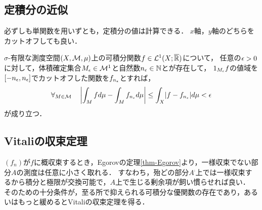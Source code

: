 \documentclass[uplatex, dvipdfmx]{jsreport}
\begin{document}
\subsection{定積分の近似}

\begin{tcolorbox}[colframe=ForestGreen, colback=ForestGreen!10!white,breakable,colbacktitle=ForestGreen!40!white,coltitle=black,fonttitle=\bfseries\sffamily,
title=]
    必ずしも単関数を用いずとも，定積分の値は計算できる．
    $x$軸，$y$軸のどちらをカットオフしても良い．
\end{tcolorbox}

\begin{theorem}
    $\sigma$-有限な測度空間$(X,\mathcal{M},\mu)$上の可積分関数$f\in\mathcal{L}^1(X;\overline{\mathbb{R}})$について，
    任意の$\epsilon>0$に対して，体積確定集合$M_\epsilon\in\mathcal{M}^1$と自然数$n_\epsilon\in\mathbb{N}$とが存在して，
    $1_{M_\epsilon}f$の値域を$[-n_\epsilon,n_\epsilon]$でカットオフした関数を$f_{n_\epsilon}$とすれば，
    \[\forall_{M\in\mathcal{M}}\quad\left|\int_Mfd\mu-\int_Mf_{n_\epsilon}d\mu\right|\le\int_X\lvert f-f_{n_\epsilon}\rvert d\mu<\epsilon\]
    が成り立つ．
\end{theorem}

\subsection{Vitaliの収束定理}\label{subsec-Vitali-convergence-theorem}

\begin{tcolorbox}[colframe=ForestGreen, colback=ForestGreen!10!white,breakable,colbacktitle=ForestGreen!40!white,coltitle=black,fonttitle=\bfseries\sffamily,
title=Lebesgueの優収束定理の描像と精緻化]
    $(f_n)$が$f$に概収束するとき，Egorovの定理\ref{thm-Egorov}より，一様収束でない部分$A$の測度は任意に小さく取れる．
    すなわち，殆どの部分$A^\comp$上では一様収束するから積分と極限が交換可能で，$A$上で生じる剰余項が飼い慣らせれば良い．
    そのための十分条件が，至る所で抑えられる可積分な優関数の存在であり，あるいはもっと緩めるとVitaliの収束定理を得る．
\end{tcolorbox}
\end{document}

